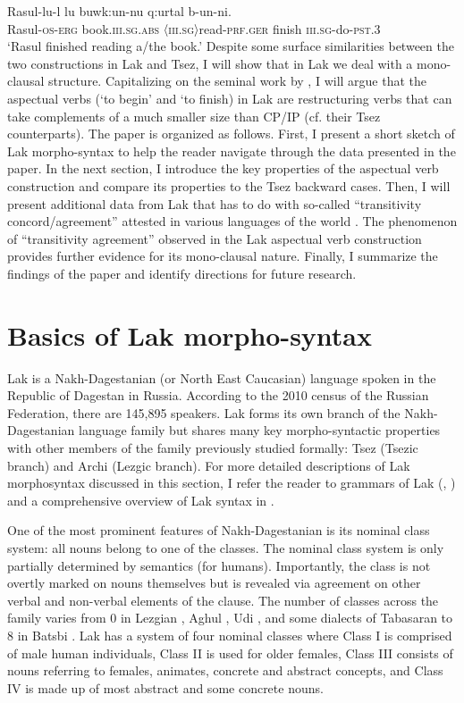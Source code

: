 \documentclass[output=paper]{langscibook}
\begin{document}
\ea\label{Rad3}
\gll Rasul-lu-l lu 	buwk:un-nu q:urtal b-un-ni.\\
Rasul-\textsc{os-erg} 		book.\textsc{iii.sg.abs} 	\textsc{〈iii.sg〉}read-\textsc{prf.ger}	finish 		\textsc{iii.sg}-do-\textsc{pst.3}\\
\glt ‘Rasul finished reading a/the book.’
\z
Despite some surface similarities between the two constructions in Lak and Tsez, I will show that in Lak we deal with a mono-clausal structure. Capitalizing on the seminal work by \citet{wurmbrand2001,Wurmbrand2004,Wurmbrand2007}, I will argue that the aspectual verbs (‘to begin’ and ‘to finish) in Lak are restructuring verbs that can take complements of a much smaller size than CP/IP (cf. their Tsez counterparts).
The paper is organized as follows. First, I present a short sketch of Lak morpho-syntax to help the reader navigate through the data presented in the paper. In the next section, I introduce the key properties of the aspectual verb construction and compare its properties to the Tsez backward cases. Then, I will present additional data from Lak that has to do with so-called “transitivity concord/agreement” attested in various languages of the world \citep{Zariquiey2014}. The phenomenon of “transitivity agreement” observed in the Lak aspectual verb construction provides further evidence for its mono-clausal nature. Finally, I summarize the findings of the paper and identify directions for future research.

\section{Basics of Lak morpho-syntax}\label{Radsect2}\largerpage[2]
Lak is a Nakh-Dagestanian (or North East Caucasian) language spoken in the Republic of Dagestan in Russia. According to the 2010 census of the Russian Federation, there are 145,895 speakers. Lak forms its own branch of the Nakh-Da\-ge\-stan\-ian language family but shares many key morpho-syntactic properties with other members of the family previously studied formally: Tsez (Tsezic branch) and Archi (Lezgic branch). For more detailed descriptions of Lak morphosyntax discussed in this section, I refer the reader to  grammars of Lak (\citealt{Zhirkov1955}, \citealt{Murkelinskij1971}) and a comprehensive overview of Lak syntax in \citet{Kazenin2013}.

One of the most prominent features of Nakh-Dagestanian is its nominal class system: all nouns belong to one of the classes. The nominal class system is only partially determined by semantics (for humans). Importantly, the class is not overtly marked on nouns themselves but is revealed via agreement on other verbal and non-verbal elements of the clause. The number of classes across the family varies from 0 in Lezgian \citep{Haspelmath1993}, Aghul \citep{Magometov1970}, Udi \citep{Harris2002}, and some dialects of Tabasaran \citep{Magometov1965} to 8 in Batsbi \citep{Desheriev1967}. Lak has a system of four nominal classes where Class I is comprised of male human individuals, Class II is used for older females, Class III consists of nouns referring to females, animates, concrete and abstract concepts, and Class IV is made up of most abstract and some concrete nouns.
\end{document}
